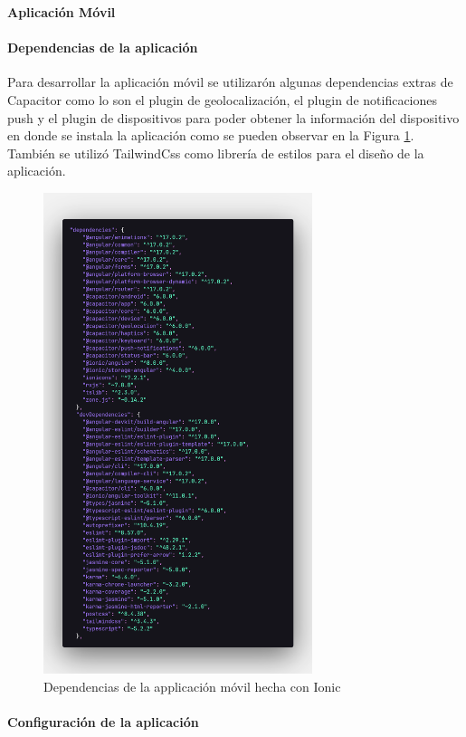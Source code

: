 \textbf{Aplicación Móvil}
\bigbreak
\paragraph{Dependencias de la aplicación}

Para desarrollar la aplicación móvil se utilizarón algunas dependencias extras de Capacitor como lo son el plugin de geolocalización, el plugin de notificaciones push y el plugin de dispositivos para poder obtener la información del dispositivo en donde se instala la aplicación como se pueden observar en la Figura \ref{fig:app-dependencias}.
También se utilizó TailwindCss como librería de estilos para el diseño de la aplicación.
\begin{figure}[H]
    \centering
    \includegraphics[width=0.7\textwidth]{resources/images/app-dependencias}
    \caption{Dependencias de la applicación móvil hecha con Ionic}
    \label{fig:app-dependencias}
\end{figure}

\paragraph{Configuración de la aplicación}

